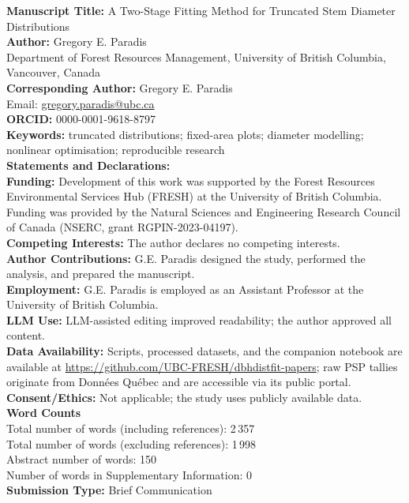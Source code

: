 \documentclass[12pt]{article}
\begin{document}
\thispagestyle{empty}
\doublespacing

\textbf{Manuscript Title:} A Two-Stage Fitting Method for Truncated Stem Diameter Distributions\\[1ex]
\textbf{Author:} Gregory E. Paradis\\
Department of Forest Resources Management, University of British Columbia, Vancouver, Canada\\[1ex]
\textbf{Corresponding Author:} Gregory E. Paradis\\
Email: \href{mailto:gregory.paradis@ubc.ca}{gregory.paradis@ubc.ca}\\[1ex]
\textbf{ORCID:} 0000-0001-9618-8797\\[1ex]
\textbf{Keywords:} truncated distributions; fixed-area plots; diameter modelling; nonlinear optimisation; reproducible research\\[1ex]
\textbf{Statements and Declarations:}\\
\textbf{Funding:} Development of this work was supported by the Forest Resources Environmental Services Hub (FRESH) at the University of British Columbia. Funding was provided by the Natural Sciences and Engineering Research Council of Canada (NSERC, grant RGPIN-2023-04197).\\
\textbf{Competing Interests:} The author declares no competing interests.\\
\textbf{Author Contributions:} G.E. Paradis designed the study, performed the analysis, and prepared the manuscript.\\
\textbf{Employment:} G.E. Paradis is employed as an Assistant Professor at the University of British Columbia.\\
\textbf{LLM Use:} LLM-assisted editing improved readability; the author approved all content.\\
\textbf{Data Availability:} Scripts, processed datasets, and the companion notebook are available at \url{https://github.com/UBC-FRESH/dbhdistfit-papers}; raw PSP tallies originate from Donn\'ees Qu\'ebec and are accessible via its public portal.\\
\textbf{Consent/Ethics:} Not applicable; the study uses publicly available data.\\[1ex]
\textbf{Word Counts}\\
Total number of words (including references): 2\,357\\
Total number of words (excluding references): 1\,998\\
Abstract number of words: 150\\
Number of words in Supplementary Information: 0\\[1ex]
\textbf{Submission Type:} Brief Communication\\
\end{document}
